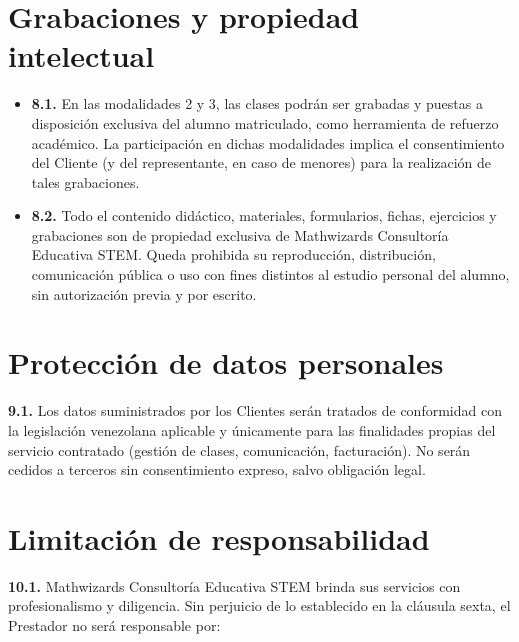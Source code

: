 \documentclass[12pt, letterpaper]{article}
\begin{document}
\section{Grabaciones y propiedad intelectual}

\begin{itemize}[leftmargin=1.5em, itemsep=4pt, topsep=4pt]
  \item \textbf{8.1.} En las modalidades 2 y 3, las clases podrán ser grabadas y puestas a disposición exclusiva del alumno matriculado, como herramienta de refuerzo académico. La participación en dichas modalidades implica el consentimiento del Cliente (y del representante, en caso de menores) para la realización de tales grabaciones.
  \item \textbf{8.2.} Todo el contenido didáctico, materiales, formularios, fichas, ejercicios y grabaciones son de propiedad exclusiva de Mathwizards Consultoría Educativa STEM. Queda prohibida su reproducción, distribución, comunicación pública o uso con fines distintos al estudio personal del alumno, sin autorización previa y por escrito.
\end{itemize}

\section{Protección de datos personales}

\noindent\textbf{9.1.} Los datos suministrados por los Clientes serán tratados de conformidad con la legislación venezolana aplicable y únicamente para las finalidades propias del servicio contratado (gestión de clases, comunicación, facturación). No serán cedidos a terceros sin consentimiento expreso, salvo obligación legal.

\section{Limitación de responsabilidad}

\noindent\textbf{10.1.} Mathwizards Consultoría Educativa STEM brinda sus servicios con profesionalismo y diligencia. Sin perjuicio de lo establecido en la cláusula sexta, el Prestador no será responsable por:
\end{document}
